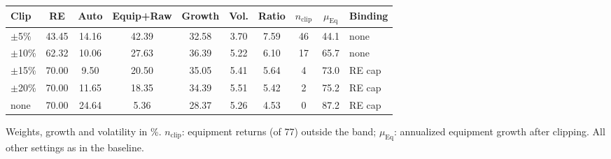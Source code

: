\begin{tabular}{lccccccccl}
\toprule
\textbf{Clip} & RE & Auto & Equip+Raw & Growth & Vol. & Ratio & $n_{\text{clip}}$ & $\mu_{\text{Eq}}$ & Binding \\
\midrule
$\pm$5\% & 43.45 & 14.16 & 42.39 & 32.58 & 3.70 & 7.59 & 46 & 44.1 & none \\
$\pm$10\% & 62.32 & 10.06 & 27.63 & 36.39 & 5.22 & 6.10 & 17 & 65.7 & none \\
$\pm$15\% & 70.00 & 9.50 & 20.50 & 35.05 & 5.41 & 5.64 & 4 & 73.0 & RE cap \\
$\pm$20\% & 70.00 & 11.65 & 18.35 & 34.39 & 5.51 & 5.42 & 2 & 75.2 & RE cap \\
none & 70.00 & 24.64 & 5.36 & 28.37 & 5.26 & 4.53 & 0 & 87.2 & RE cap \\
\bottomrule
\end{tabular}
\par\smallskip\parbox{\linewidth}{\footnotesize Weights, growth and volatility in \%. $n_{\text{clip}}$: equipment returns (of 77) outside the band; $\mu_{\text{Eq}}$: annualized equipment growth after clipping. All other settings as in the baseline.}
